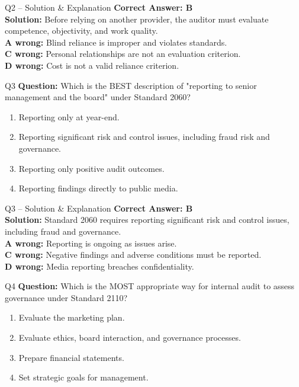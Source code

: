 \documentclass[aspectratio=169,10pt]{beamer}
\begin{document}
	\begin{frame}[t]{Q2 -- Solution \& Explanation}
		\small
		\textbf{Correct Answer: B} \\[4pt]
		\textbf{Solution:} Before relying on another provider, the auditor must evaluate competence, objectivity, and work quality. \\[4pt]
		\textbf{A wrong:} Blind reliance is improper and violates standards. \\[2pt]
		\textbf{C wrong:} Personal relationships are not an evaluation criterion. \\[2pt]
		\textbf{D wrong:} Cost is not a valid reliance criterion.
	\end{frame}
	
	\begin{frame}[t]{Q3}
		\small
		\textbf{Question:} Which is the BEST description of "reporting to senior management and the board" under Standard 2060?
		\begin{enumerate}[label=\Alph*.,itemsep=1pt,topsep=2pt]
			\item Reporting only at year-end.
			\item Reporting significant risk and control issues, including fraud risk and governance.
			\item Reporting only positive audit outcomes.
			\item Reporting findings directly to public media.
		\end{enumerate}
	\end{frame}
	
	\begin{frame}[t]{Q3 -- Solution \& Explanation}
		\small
		\textbf{Correct Answer: B} \\[4pt]
		\textbf{Solution:} Standard 2060 requires reporting significant risk and control issues, including fraud and governance. \\[4pt]
		\textbf{A wrong:} Reporting is ongoing as issues arise. \\[2pt]
		\textbf{C wrong:} Negative findings and adverse conditions must be reported. \\[2pt]
		\textbf{D wrong:} Media reporting breaches confidentiality.
	\end{frame}
	
	\begin{frame}[t]{Q4}
		\small
		\textbf{Question:} Which is the MOST appropriate way for internal audit to assess governance under Standard 2110?
		\begin{enumerate}[label=\Alph*.,itemsep=1pt,topsep=2pt]
			\item Evaluate the marketing plan.
			\item Evaluate ethics, board interaction, and governance processes.
			\item Prepare financial statements.
			\item Set strategic goals for management.
		\end{enumerate}
	\end{frame}
	
\end{document}
